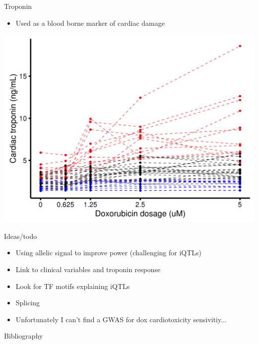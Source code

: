 \documentclass{beamer}
\begin{document}
\begin{frame}{Troponin}
\begin{itemize}
\item Used as a blood borne marker of cardiac damage
\end{itemize}
\centering
\includegraphics[width=\textwidth,clip,trim=0 0 0 0]{../figures/troponin.png}
\end{frame}

\begin{frame}{Ideas/todo}
\begin{itemize}
\item Using allelic signal to improve power (challenging for iQTLs)
\item Link to clinical variables and troponin response
\item Look for TF motifs explaining iQTLs
\item Splicing
\item Unfortunately I can't find a GWAS for dox cardiotoxicity sensivitiy...
\end{itemize}
\end{frame}

\begin{frame}[allowframebreaks]{Bibliography}
\small
\def\newblock{}


\end{frame}
\end{document}
